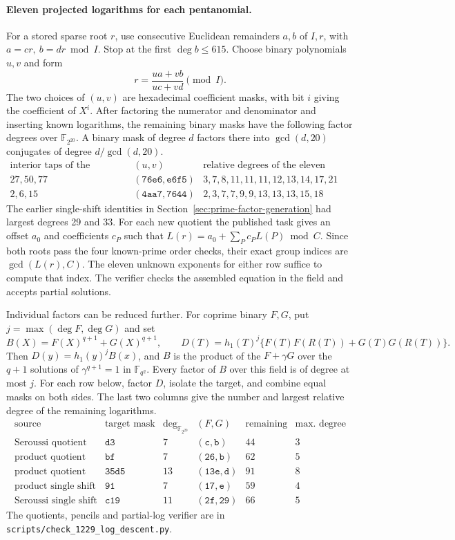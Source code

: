 \documentclass[11pt]{article}
\begin{document}
\paragraph{Eleven projected logarithms for each pentanomial.}
For a stored sparse root \(r\), use consecutive Euclidean remainders
\(a,b\) of \(I,r\), with \(a=c r,\ b=d r\bmod I\). Stop at the first
\(\deg b\le615\). Choose binary polynomials \(u,v\) and form
\[
   r=\frac{u a+v b}{u c+v d}\pmod I .
\]
The two choices of \((u,v)\) are hexadecimal coefficient masks,
with bit \(i\) giving the coefficient of \(X^i\). After factoring
the numerator and denominator and inserting known logarithms, the
remaining binary masks have the following factor degrees over
\(\mathbb F_{2^{20}}\). A binary mask of degree \(d\) factors there
into \(\gcd(d,20)\) conjugates of degree \(d/\gcd(d,20)\).
\[
\begin{array}{c|c|l}
 \text{interior taps of the pentanomial}&(u,v)&
       \text{relative degrees of the eleven masks}\\\hline
 27,50,77&(\mathtt{76e6},\mathtt{e6f5})&3,7,8,11,11,11,12,13,14,17,21\\
 2,6,15&(\mathtt{4aa7},\mathtt{7644})&2,3,7,7,9,9,13,13,13,15,18
\end{array}
\]
The earlier single-shift identities in Section~\ref{sec:prime-factor-generation}
had largest degrees 29 and 33. For each new quotient the published
task gives an offset \(a_0\) and coefficients \(c_P\) such that
\(L(r)=a_0+\sum_P c_P L(P)\bmod C\).
Since both roots pass the four known-prime order checks,
their exact group indices are \(\gcd(L(r),C)\). The eleven unknown
exponents for either row suffice to compute that index. The verifier
checks the assembled equation in the field and accepts partial solutions.

Individual factors can be reduced further. For
coprime binary \(F,G\), put \(j=\max(\deg F,\deg G)\) and set
\[
 B(X)=F(X)^{q+1}+G(X)^{q+1},\qquad
 D(T)=h_1(T)^j\{F(T)F(R(T))+G(T)G(R(T))\}.
\]
Then \(D(y)=h_1(y)^j B(x)\), and \(B\) is the product of the
\(F+\gamma G\) over the \(q+1\) solutions of \(\gamma^{q+1}=1\) in
\(\mathbb F_{q^2}\). Every factor of \(B\) over this field is of degree
at most \(j\). For each row below, factor \(D\), isolate the target,
and combine equal masks on both sides. The last two columns give the
number and largest relative degree of the remaining logarithms.
\[
\begin{array}{l|c|c|c|r|r}
 \text{source}&\text{target mask}&\deg_{\mathbb F_{2^{20}}}&(F,G)&
 \text{remaining}&\text{max. degree}\\\hline
 \text{Seroussi quotient}&\mathtt{d3}&7&(\mathtt c,\mathtt b)&44&3\\
 \text{product quotient}&\mathtt{bf}&7&(\mathtt{26},\mathtt b)&62&5\\
 \text{product quotient}&\mathtt{35d5}&13&(\mathtt{13e},\mathtt d)&91&8\\
 \text{product single shift}&\mathtt{91}&7&(\mathtt{17},\mathtt e)&59&4\\
 \text{Seroussi single shift}&\mathtt{c19}&11&(\mathtt{2f},\mathtt{29})&66&5
\end{array}
\]
The quotients, pencils and partial-log verifier are in
\nolinkurl{scripts/check_1229_log_descent.py}.
\end{document}
